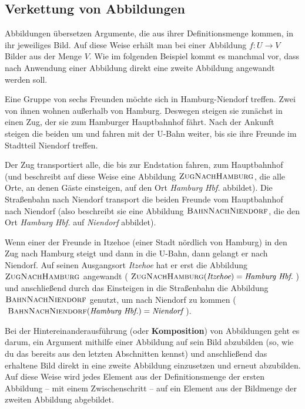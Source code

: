 \documentclass[../../main.tex]{subfiles}
\begin{document}
\subsection{Verkettung von Abbildungen}
\label{sec:abbildungen_verkettung}

Abbildungen übersetzen Argumente, die aus ihrer Definitionsmenge kommen, in ihr jeweiliges Bild. Auf diese Weise erhält man bei einer Abbildung $f\colon U\rightarrow V$ Bilder aus der Menge $V$. Wie im folgenden Beispiel kommt es manchmal vor, dass nach Anwendung einer Abbildung direkt eine zweite Abbildung angewandt werden soll.

\begin{example}
    Eine Gruppe von sechs Freunden möchte sich in Hamburg-Niendorf treffen. Zwei von ihnen wohnen außerhalb von Hamburg. Deswegen steigen sie zunächst in einen Zug, der sie zum Hamburger Hauptbahnhof fährt. Nach der Ankunft steigen die beiden um und fahren mit der U-Bahn weiter, bis sie ihre Freunde im Stadtteil Niendorf treffen.
    
    Der Zug transportiert alle, die bis zur Endstation fahren, zum Hauptbahnhof (und beschreibt auf diese Weise eine Abbildung $\textsc{ZugNachHamburg}$, die alle Orte, an denen Gäste einsteigen, auf den Ort \emph{Hamburg Hbf.} abbildet). Die Straßenbahn nach Niendorf transport die beiden Freunde vom Hauptbahnhof nach Niendorf (also beschreibt sie eine Abbildung $\textsc{BahnNachNiendorf}$, die den Ort \emph{Hamburg Hbf.} auf \emph{Niendorf} abbildet).
    
    Wenn einer der Freunde in Itzehoe (einer Stadt nördlich von Hamburg) in den Zug nach Hamburg steigt und dann in die U-Bahn, dann gelangt er nach Niendorf. Auf seinen Ausgangsort \emph{Itzehoe} hat er erst die Abbildung $\textsc{ZugNachHamburg}$ angewandt ($\textsc{ZugNachHamburg}(\emph{Itzehoe})=\emph{Hamburg Hbf.}$) und anschließend durch das Einsteigen in die Straßenbahn die Abbildung $\textsc{BahnNachNiendorf}$ genutzt, um nach Niendorf zu kommen ($\textsc{BahnNachNiendorf}(\emph{Hamburg Hbf.})=\emph{Niendorf}$).
\end{example}

Bei der Hintereinanderausführung (oder \textbf{Komposition}) von Abbildungen geht es darum, ein Argument mithilfe einer Abbildung auf sein Bild abzubilden (so, wie du das bereits aus den letzten Abschnitten kennst) und anschließend das erhaltene Bild direkt in eine zweite Abbildung einzusetzen und erneut abzubilden. Auf diese Weise wird jedes Element aus der Definitionsmenge der ersten Abbildung -- mit einem Zwischenschritt -- auf ein Element aus der Bildmenge der zweiten Abbildung abgebildet.
\end{document}
